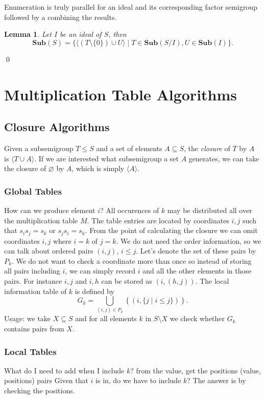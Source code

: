 \documentclass{amsart}
\newcommand{\Sub}{\mathbf{Sub}}
\theoremstyle{plain}
\newtheorem{lemma}[theorem]{Lemma}
\theoremstyle{definition}
\begin{document}
Enumeration is truly parallel for an ideal and its corresponding factor semigroup followed by a combining the results.
\begin{lemma}
Let $I$ be an ideal of $S$, then $$\Sub(S)=\big\{\langle (T\setminus\{0\})\cup U \rangle\mid T\in \Sub(S/I), U\in\Sub(I)\big\}.$$
\end{lemma}
\proof

\qed

\section{Multiplication Table Algorithms}

\subsection{Closure Algorithms}
Given a subsemigroup $T\leq S$ and a set of elements  $A\subseteq S$, the \emph{closure} of $T$ by $A$ is $\langle T\cup A \rangle$.
If we are interested what subsemigroup a set $A$ generates, we can take the closure of $\varnothing$ by $A$, which is simply $\langle A\rangle$.
\subsubsection{Global Tables}
How can we produce element $i$?
All occurences of $k$ may be distributed all over the multiplication table $M$.
The table entries are located by coordinates $i,j$ such that $s_is_j=s_k$ or $s_js_i=s_k$.
From the point of calculating the closure we can  omit coordinates $i,j$ where $i=k$ of $j=k$. 
We do not need the order information, so we can talk about ordered pairs $(i,j)$, $i\leq j$. 
Let's denote the set of these pairs by $P_k$.
We do not want to check a coordinate more than once so instead of storing all pairs including $i$, we can simply record $i$ and all the other elements in those pairs.
For instance $i,j$ and $i,h$ can be stored as $(i,(h,j))$.
The local information table of $k$ is defined by
$$G_k=\bigcup_{(i,j)\in P_k} \left\{ (i,\{j\mid i\leq j\})\right\}.$$
Usage: we take $X\subseteq S$ and for all elements $k$ in $S\setminus X$ we check whether $G_k$ contains pairs from $X$. 

\subsubsection{Local Tables} What do I need to add when I include $k$?
 from the value, get the positions (value, positions) pairs
Given that $i$ is in, do we have to include $k$? The answer is by checking the positions. 
\end{document}
